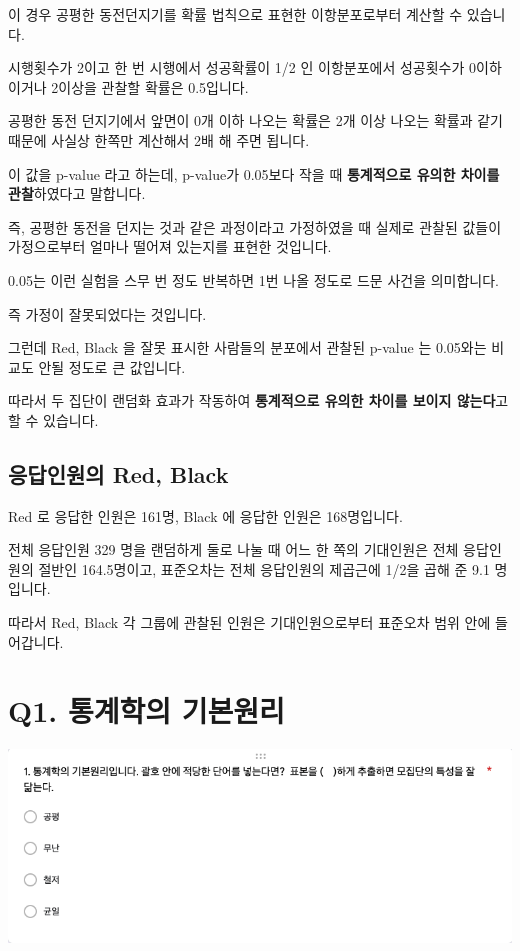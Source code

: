 \documentclass[
]{book}
\begin{document}
이 경우 공평한 동전던지기를 확률 법칙으로 표현한 이항분포로부터 계산할 수 있습니다.

시행횟수가 2이고 한 번 시행에서 성공확률이 1/2 인 이항분포에서 성공횟수가 0이하이거나 2이상을 관찰할 확률은 0.5입니다.

공평한 동전 던지기에서 앞면이 0개 이하 나오는 확률은 2개 이상 나오는 확률과 같기 때문에 사실상 한쪽만 계산해서 2배 해 주면 됩니다.

이 값을 p-value 라고 하는데, p-value가 0.05보다 작을 때 \textbf{통계적으로 유의한 차이를 관찰}하였다고 말합니다.

즉, 공평한 동전을 던지는 것과 같은 과정이라고 가정하였을 때 실제로 관찰된 값들이 가정으로부터 얼마나 떨어져 있는지를 표현한 것입니다.

0.05는 이런 실험을 스무 번 정도 반복하면 1번 나올 정도로 드문 사건을 의미합니다.

즉 가정이 잘못되었다는 것입니다.

그런데 Red, Black 을 잘못 표시한 사람들의 분포에서 관찰된 p-value 는 0.05와는 비교도 안될 정도로 큰 값입니다.

따라서 두 집단이 랜덤화 효과가 작동하여 \textbf{통계적으로 유의한 차이를 보이지 않는다}고 할 수 있습니다.

\subsection{응답인원의 Red, Black}\label{uxc751uxb2f5uxc778uxc6d0uxc758-red-black-6}

Red 로 응답한 인원은 161명, Black 에 응답한 인원은 168명입니다.

전체 응답인원 329 명을 랜덤하게 둘로 나눌 때 어느 한 쪽의 기대인원은 전체 응답인원의 절반인 164.5명이고, 표준오차는 전체 응답인원의 제곱근에 1/2을 곱해 준 9.1 명입니다.

따라서 Red, Black 각 그룹에 관찰된 인원은 기대인원으로부터 표준오차 범위 안에 들어갑니다.

\section{Q1. 통계학의 기본원리}\label{q1.-uxd1b5uxacc4uxd559uxc758-uxae30uxbcf8uxc6d0uxb9ac}

\begin{flushleft}\includegraphics[width=0.75\linewidth]{./pics/Quiz210406_Q1} \end{flushleft}
\end{document}
